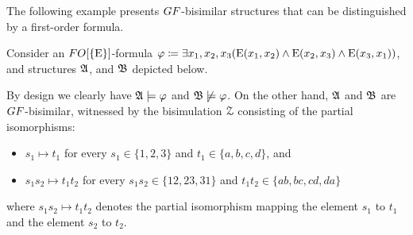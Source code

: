 The following example presents $\GF$-bisimilar structures that can be distinguished by a first-order formula.
\begin{example}
  Consider an $\FO[\{\relE\}]$-formula $\varphi \coloneqq \exists{x_{1}, x_{2}, x_{3}}(\mathrm{E}(x_{1}, x_{2}) \land \mathrm{E}(x_{2}, x_{3}) \land \mathrm{E}(x_{3}, x_{1}))$, and structures ${\mathfrak{A}}$, and ${\mathfrak{B}}$ depicted below.
  \begin{figure}[H]
  \centering
  \end{figure}
  By design we clearly have ${\mathfrak{A}}\models \varphi$ and ${\mathfrak{B}} \not\models \varphi$. On the other hand, ${\mathfrak{A}}$ and ${\mathfrak{B}}$ are $\GF$-bisimilar, witnessed by the bisimulation $\mathcal{Z}$ consisting of the partial isomorphisms:
  \begin{itemize}
    \item $s_{1} \mapsto t_{1}$ for every $s_{1} \in \{1,2,3\}$ and $t_{1} \in \{a,b,c,d\}$, and
    \item $s_{1}s_{2} \mapsto t_{1}t_{2}$ for every $s_{1}s_{2} \in \{12,23,31\}$ and $t_{1}t_{2} \in \{ab,bc,cd,da\}$
  \end{itemize}
  where $s_{1}s_{2} \mapsto t_{1}t_{2}$ denotes the partial isomorphism mapping the element $s_{1}$ to $t_{1}$ and the element $s_{2}$ to $t_{2}$.
\end{example}

